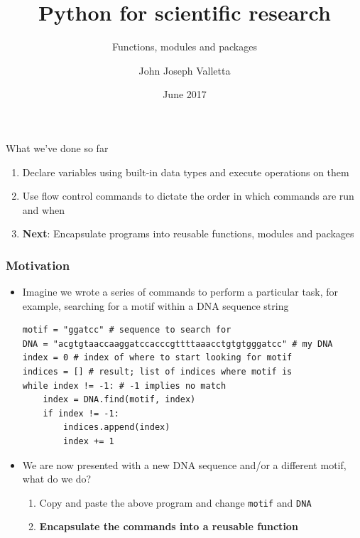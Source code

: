 \documentclass[pdf]{beamer}
\title[Python for scientific research]{Python for scientific research}
\subtitle{Functions, modules and packages}
\author{John Joseph Valletta}
\date[June 2017]{June 2017}
\institute[]{University of Exeter, Penryn Campus, UK}
\begin{document}
\begin{frame}
\titlepage
\end{frame}

\begin{frame}{What we've done so far}

	\begin{enumerate}\addtolength{\itemsep}{1\baselineskip}
		\item Declare variables using built-in data types and execute operations
		on them
		\item Use flow control commands to dictate the order in which commands are run
		and when
		\item \textbf{Next}: Encapsulate programs into reusable functions, modules and packages
	\end{enumerate}

\end{frame}

\begin{frame}[fragile]
\frametitle{Motivation}

\begin{itemize}\addtolength{\itemsep}{-1\baselineskip}
	\item<1-> Imagine we wrote a series of commands to perform a particular task, for example,
	searching for a motif within a DNA sequence string 

\begin{lstlisting}[style=python]
motif = "ggatcc" # sequence to search for
DNA = "acgtgtaaccaaggatccacccgttttaaacctgtgtgggatcc" # my DNA
index = 0 # index of where to start looking for motif
indices = [] # result; list of indices where motif is
while index != -1: # -1 implies no match
    index = DNA.find(motif, index)
    if index != -1:
        indices.append(index)
        index += 1
\end{lstlisting}

	\item <2-> We are now presented with a new DNA sequence and/or a different motif, what do we do? 
	\begin{enumerate}\addtolength{\itemsep}{0.5\baselineskip}
		\item<2-> Copy and paste the above program and change \texttt{motif} and \texttt{DNA}
		\item<3-> \textbf{Encapsulate the commands into a reusable function}
	\end{enumerate}

\end{itemize}

\end{frame}
\end{document}

